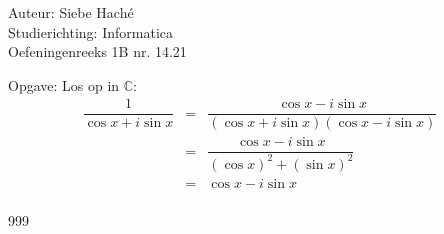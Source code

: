\documentclass[a4paper]{article}
\begin{document}
\noindent \large Auteur: Siebe Haché \\
\noindent \large Studierichting: Informatica\\
\noindent \large Oefeningenreeks 1B nr. 14.21\\

\medskip

\normalsize

Opgave: Los op in $\mathbb{C}$:\\

\begin{eqnarray*}
   \dfrac{1}{\cos x + i \sin x} &=& \dfrac{\cos x - i\sin x} {(\cos x + i \sin x)(\cos x - i\sin x)}\\
    &=& \dfrac{\cos x - i\sin x}{(\cos x)^2 + (\sin x)^2}\\
    &=& \cos x - i\sin x\\
\end{eqnarray*}

 
\begin{thebibliography}{999}
\end{thebibliography}
\end{document}
